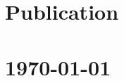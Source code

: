 \documentclass{article}
\begin{document}
\section*{Publication}

























\vfill

\section*{\hfill\color{OliveGreen}\today}
\end{document}
